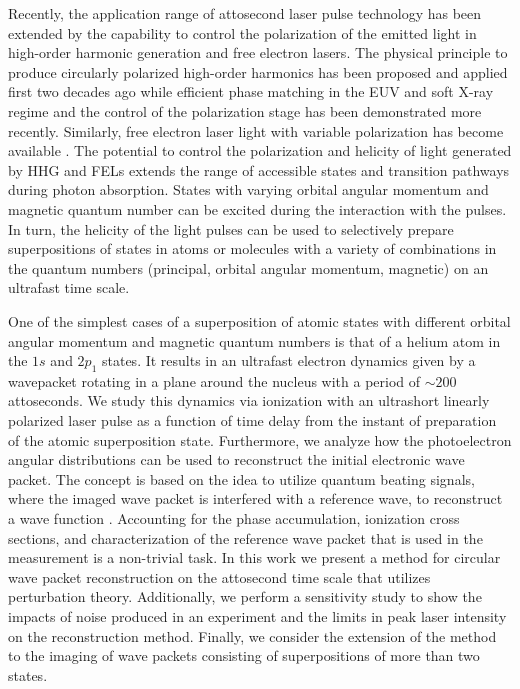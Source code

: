 Recently, the application range of attosecond laser pulse technology has been extended by the capability to control the polarization of the emitted light in high-order harmonic generation and free electron lasers. The physical principle to produce circularly polarized high-order harmonics has been proposed and applied first two decades ago \cite{eichmann95} while efficient phase matching in the EUV and soft X-ray regime \cite{fleischer_spin_2014,fan_bright_2015,hickstein_non-collinear_2015} and the control of the polarization stage \cite{huang_polarization_2018} has been demonstrated more recently. Similarly, free electron laser light with variable polarization has become available \cite{spezzani2011,mazza_determining_2014}. The potential to control the polarization and helicity of light generated by HHG and FELs extends the range of accessible states and transition pathways during photon absorption. States with varying orbital angular momentum and magnetic quantum number can be excited during the interaction with the pulses. In turn, the helicity of the light pulses can be used to selectively prepare superpositions of states in atoms or molecules with a variety of combinations in the quantum numbers (principal, orbital angular momentum, magnetic) on an ultrafast time scale. 

One of the simplest cases of a superposition of atomic states with different orbital angular momentum and magnetic quantum numbers is that of a helium atom in the $1s$ and $2p_1$ states. It results in an ultrafast electron dynamics given by a wavepacket rotating in a plane around the nucleus with a period of $\sim200$ attoseconds. We study this dynamics via ionization with an ultrashort linearly polarized laser pulse as a function of time delay from the instant of preparation of the atomic superposition state. Furthermore, we analyze how the photoelectron angular distributions can be used to reconstruct the initial electronic wave packet. The concept is based on the idea to utilize quantum beating signals, where the imaged wave packet is interfered with a reference wave, to reconstruct a wave function \cite{paul_observation_2001,muller_reconstruction_2002,Mauritsson2010,klunder2013,priebe_attosecond_2017,jiang_theory_2020}. Accounting for the phase accumulation, ionization cross sections, and characterization of the reference wave packet that is used in the measurement is a non-trivial task. In this work we present a method for circular wave packet reconstruction on the attosecond time scale that utilizes perturbation theory. Additionally, we perform a sensitivity study to show the impacts of noise produced in an experiment and the limits in peak laser intensity on the reconstruction method. Finally, we consider the extension of the method to the imaging of wave packets consisting of superpositions of more than two states.

